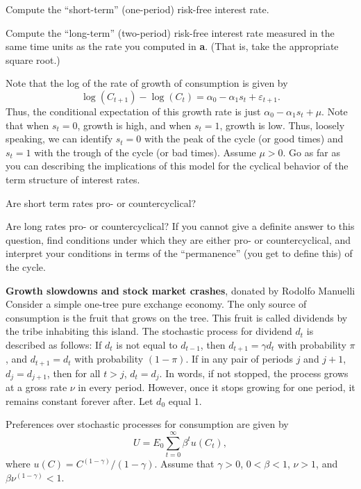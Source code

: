  Compute the ``short-term'' (one-period) risk-free interest rate.
\medskip

 Compute the ``long-term'' (two-period) risk-free interest rate measured in the
same time units as the rate you computed in {\bf a}. (That is, take the
appropriate square root.)
\medskip

 Note that the log of the rate of growth of consumption is given by
$$ \log(C_{t+1}) - \log(C_t) = \alpha_0 - \alpha_1 s_t + \varepsilon_{t+1}.
 $$
Thus, the conditional expectation of this growth rate is just $\alpha_0 -
\alpha_1 s_t + \mu$.  Note that when $s_t=0$, growth is high, and
when $s_t=1$, growth is low.  Thus, loosely speaking, we can identify
$s_t=0$ with the peak of the cycle (or good times) and $s_t=1$ with
the trough of the cycle (or bad times).  Assume $\mu>0$.  Go as far
as you can describing the implications of this model for the cyclical
behavior of the term structure of interest rates.
\medskip

 Are short term rates pro- or countercyclical?
\medskip

 Are long rates pro- or countercyclical?  If you cannot give a definite
answer to this question, find conditions under which they are either pro-
or countercyclical, and interpret your conditions in terms of the
``permanence'' (you get to define this) of the cycle.

\medskip
{} \quad
  {\bf Growth slowdowns and stock market crashes},
donated by Rodolfo Manuelli
\medskip\noindent
Consider a simple one-tree pure exchange economy.  The only source of
consumption is the fruit that grows on the tree.  This fruit is called
dividends by the tribe inhabiting this island.  The stochastic process
for dividend ${d_t}$ is described as follows:
If $d_t$ is not equal to $d_{t-1}$, then $d_{t+1}=\gamma d_t$ with
probability $\pi$, and $d_{t+1}=d_t$ with probability $(1-\pi)$.
If in any pair of periods $j$ and $j+1$, $d_j=d_{j+1}$, then for all
$t>j$, $d_t=d_j$.  In words, if not stopped, the process grows at
a  gross rate $\nu$ in every period.  However, once it stops growing
for one period, it remains constant forever after.  Let $d_0$ equal $1$.
\medskip

Preferences over stochastic processes for consumption are given by
$$ U = E_0 {\sum_{t=0}^\infty \beta^t u(C_t)}, $$
where $u(C)=C^{(1-\gamma)}/(1-\gamma)$.  Assume that $\gamma>0$,
$0<\beta<1$, %
$\nu>1$, and
 $\beta \nu^{(1-\gamma)}<1$.
\medskip

